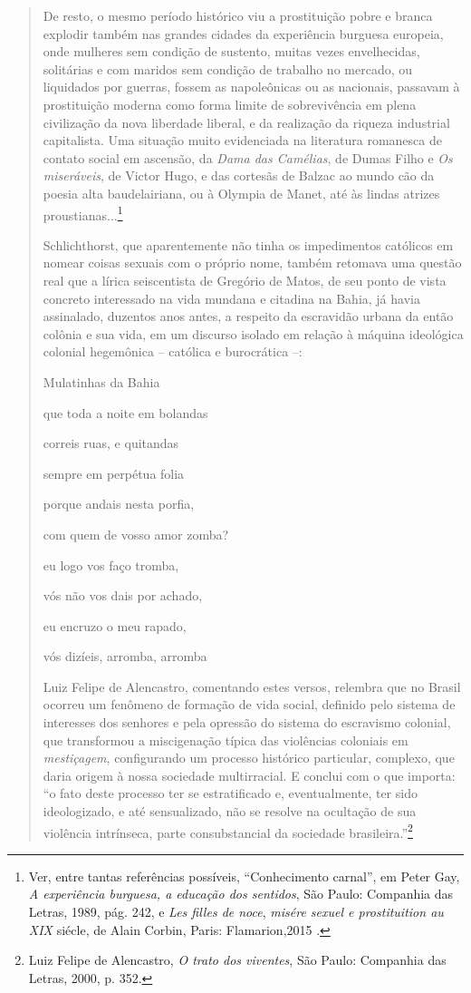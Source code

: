 \begin{quote}
De resto, o mesmo período histórico viu a prostituição pobre e branca
explodir também nas grandes cidades da experiência burguesa europeia,
onde mulheres sem condição de sustento, muitas vezes envelhecidas,
solitárias e com maridos sem condição de trabalho no mercado, ou
liquidados por guerras, fossem as napoleônicas ou as nacionais, passavam
à prostituição moderna como forma limite de sobrevivência em plena
civilização da nova liberdade liberal, e da realização da riqueza
industrial capitalista. Uma situação muito evidenciada na literatura
romanesca de contato social em ascensão, da \emph{Dama das Camélias}, de
Dumas Filho e \emph{Os miseráveis}, de Victor Hugo, e das cortesãs de
Balzac ao mundo cão da poesia alta baudelairiana, ou à Olympia de Manet,
até às lindas atrizes proustianas...\footnote{Ver, entre tantas
  referências possíveis, ``Conhecimento carnal'', em Peter Gay, \emph{A
  experiência burguesa, a educação dos sentidos}, São Paulo: Companhia
  das Letras, 1989, pág. 242, e \emph{Les filles de noce}, \emph{misére
  sexuel e prostituition au XIX} siécle, de Alain Corbin, Paris:
  Flamarion,2015 .}

Schlichthorst, que aparentemente não tinha os impedimentos católicos em
nomear coisas sexuais com o próprio nome, também retomava uma questão
real que a lírica seiscentista de Gregório de Matos, de seu ponto de
vista concreto interessado na vida mundana e citadina na Bahia, já havia
assinalado, duzentos anos antes, a respeito da escravidão urbana da
então colônia e sua vida, em um discurso isolado em relação à máquina
ideológica colonial hegemônica -- católica e burocrática --:

Mulatinhas da Bahia

que toda a noite em bolandas

correis ruas, e quitandas

sempre em perpétua folia

porque andais nesta porfia,

com quem de vosso amor zomba?

eu logo vos faço tromba,

vós não vos dais por achado,

eu encruzo o meu rapado,

vós dizíeis, arromba, arromba

Luiz Felipe de Alencastro, comentando estes versos, relembra que no
Brasil ocorreu um fenômeno de formação de vida social, definido pelo
sistema de interesses dos senhores e pela opressão do sistema do
escravismo colonial, que transformou a miscigenação típica das
violências coloniais em \emph{mestiçagem}, configurando um processo
histórico particular, complexo, que daria origem à nossa sociedade
multirracial. E conclui com o que importa: ``o fato deste processo ter
se estratificado e, eventualmente, ter sido ideologizado, e até
sensualizado, não se resolve na ocultação de sua violência intrínseca,
parte consubstancial da sociedade brasileira.''\footnote{Luiz Felipe de
  Alencastro, \emph{O trato dos viventes}, São Paulo: Companhia das
  Letras, 2000, p. 352.}


\end{quote}
